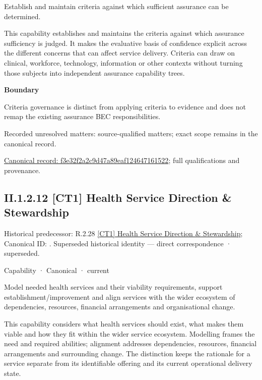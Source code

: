 Establish and maintain criteria against which sufficient assurance can be determined.



This capability establishes and maintains the criteria against which assurance sufficiency is judged. It makes the evaluative basis of confidence explicit across the different concerns that can affect service delivery. Criteria can draw on clinical, workforce, technology, information or other contexts without turning those subjects into independent assurance capability trees.



\textbf{Boundary}



Criteria governance is distinct from applying criteria to evidence and does not remap the existing assurance BEC responsibilities.


{\small Recorded unresolved matters: source-qualified matters; exact scope remains in the canonical record.}\par
{\footnotesize \href{../../../../../../../continuum/strategy/capability/f3e32f2a2c9d47a89eaf124647161522.md}{Canonical record: f3e32f2a2c9d47a89eaf124647161522}; full qualifications and provenance.}\par
\subsection*{II.1.2.12 [CT1] Health Service Direction \& Stewardship}
\label{navigation:II.1.2.12}

{\small Historical predecessor: R.2.28 \hyperref[element:360bf50f92484448a01cc57f2dbce23c]{[CT1] Health Service Direction \& Stewardship}; Canonical ID: \texttt{}. Superseded historical identity — direct correspondence · superseded.}\par
\label{element:d51e7125bf9c4d2c9c59b60346b4d86f}
{\small Capability · Canonical · current}\par

Model needed health services and their viability requirements, support establishment/improvement and align services with the wider ecosystem of dependencies, resources, financial arrangements and organisational change.



This capability considers what health services should exist, what makes them viable and how they fit within the wider service ecosystem. Modelling frames the need and required abilities; alignment addresses dependencies, resources, financial arrangements and surrounding change. The distinction keeps the rationale for a service separate from its identifiable offering and its current operational delivery state.



